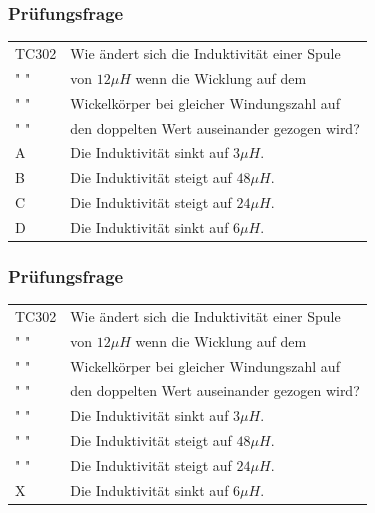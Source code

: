 \begin{frame}
    \frametitle{Prüfungsfrage}

    \begin{center}
    \begin{tabular}{l||l}\hline
        TC302 & Wie ändert sich die Induktivität einer Spule \\
         " "  & von $12 \mu H$ wenn die Wicklung auf dem \\ 
         " "  & Wickelkörper bei gleicher Windungszahl auf\\
           " "  & den doppelten Wert auseinander gezogen wird? \\\hline\hline
        A & Die Induktivität sinkt auf $3 \mu H$. \\ \hline
        B & Die Induktivität steigt auf $48 \mu H$. \\ \hline
        C & Die Induktivität steigt auf $24 \mu H$. \\ \hline
        D & Die Induktivität sinkt auf $6 \mu H$. \\ \hline
    \end{tabular}
 	    \end{center}
\end{frame}

\begin{frame}
    \frametitle{Prüfungsfrage}

    \begin{center}
    \begin{tabular}{l||l}\hline
        TC302 & Wie ändert sich die Induktivität einer Spule \\
         " "  & von $12 \mu H$ wenn die Wicklung auf dem \\ 
         " "  & Wickelkörper bei gleicher Windungszahl auf\\
           " "  & den doppelten Wert auseinander gezogen wird? \\\hline\hline
        " " & Die Induktivität sinkt auf $3 \mu H$. \\ \hline
        " " & Die Induktivität steigt auf $48 \mu H$. \\ \hline
        " " & Die Induktivität steigt auf $24 \mu H$. \\ \hline
        X & Die Induktivität sinkt auf $6 \mu H$. \\ \hline
    \end{tabular}
 	    \end{center}
\end{frame}

